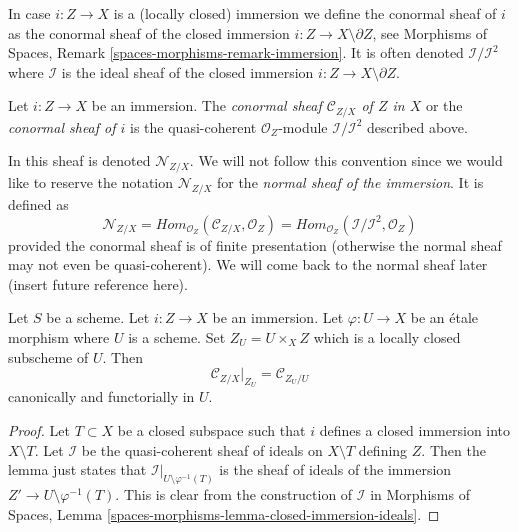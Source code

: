 \medskip\noindent
In case $i : Z \to X$ is a (locally closed) immersion we define the
conormal sheaf of $i$ as the conormal sheaf of the closed
immersion $i : Z \to X \setminus \partial Z$, see
Morphisms of Spaces, Remark \ref{spaces-morphisms-remark-immersion}.
It is often denoted
$\mathcal{I}/\mathcal{I}^2$ where $\mathcal{I}$ is the ideal sheaf
of the closed immersion $i : Z \to X \setminus \partial Z$.

\begin{definition}
\label{definition-conormal-sheaf}
Let $i : Z \to X$ be an immersion. The {\it conormal sheaf
$\mathcal{C}_{Z/X}$ of $Z$ in $X$} or the {\it conormal sheaf of $i$}
is the quasi-coherent $\mathcal{O}_Z$-module $\mathcal{I}/\mathcal{I}^2$
described above.
\end{definition}

\noindent
In \cite[IV Definition 16.1.2]{EGA} this sheaf is denoted
$\mathcal{N}_{Z/X}$. We will not follow this convention since we would
like to reserve the notation $\mathcal{N}_{Z/X}$
for the {\it normal sheaf of the immersion}. It is defined as
$$
\mathcal{N}_{Z/X} =
\textit{Hom}_{\mathcal{O}_Z}(\mathcal{C}_{Z/X}, \mathcal{O}_Z) =
\textit{Hom}_{\mathcal{O}_Z}(\mathcal{I}/\mathcal{I}^2, \mathcal{O}_Z)
$$
provided the conormal sheaf is of finite presentation (otherwise the
normal sheaf may not even be quasi-coherent). We will come back to the
normal sheaf later (insert future reference here).

\begin{lemma}
\label{lemma-etale-conormal}
Let $S$ be a scheme. Let $i : Z \to X$ be an immersion.
Let $\varphi : U \to X$ be an \'etale morphism where $U$ is a scheme.
Set $Z_U = U \times_X Z$ which is a locally closed subscheme of $U$.
Then
$$
\mathcal{C}_{Z/X}|_{Z_U} = \mathcal{C}_{Z_U/U}
$$
canonically and functorially in $U$.
\end{lemma}

\begin{proof}
Let $T \subset X$ be a closed subspace such that $i$ defines a closed
immersion into $X \setminus T$.
Let $\mathcal{I}$ be the quasi-coherent sheaf of ideals on
$X \setminus T$ defining $Z$. Then the lemma just states that
$\mathcal{I}|_{U \setminus \varphi^{-1}(T)}$ is the sheaf of ideals of
the immersion $Z' \to U \setminus \varphi^{-1}(T)$.
This is clear from the construction of $\mathcal{I}$ in
Morphisms of Spaces, Lemma \ref{spaces-morphisms-lemma-closed-immersion-ideals}.
\end{proof}


